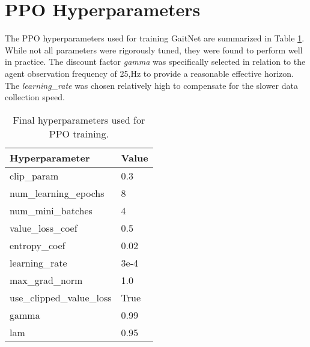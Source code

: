 \section{PPO Hyperparameters}
\label{sec:appendix-ppo-hyperparameters}

The PPO hyperparameters used for training GaitNet are summarized in
Table \ref{tab:ppo-hyperparams}. While not all parameters were
rigorously tuned, they were found to perform well in practice. The
discount factor \textit{gamma} was specifically selected in relation
to the agent observation frequency of 25,Hz to provide a reasonable
effective horizon. The \textit{learning\_rate} was chosen relatively
high to compensate for the slower data collection speed.

\begin{table}[h!]
  \centering
  \begin{tabular}{ll}
    \hline
    \textbf{Hyperparameter} & \textbf{Value} \\
    \hline
    clip\_param & 0.3 \\     num\_learning\_epochs & 8 \\
    num\_mini\_batches & 4 \\     value\_loss\_coef & 0.5 \\
    entropy\_coef & 0.02 \\     learning\_rate & 3e-4 \\
    max\_grad\_norm & 1.0 \\     use\_clipped\_value\_loss & True \\
    gamma & 0.99 \\     lam & 0.95 \\
    \hline
  \end{tabular}
  \caption{Final hyperparameters used for PPO training.}
  \label{tab:ppo-hyperparams}
\end{table}

